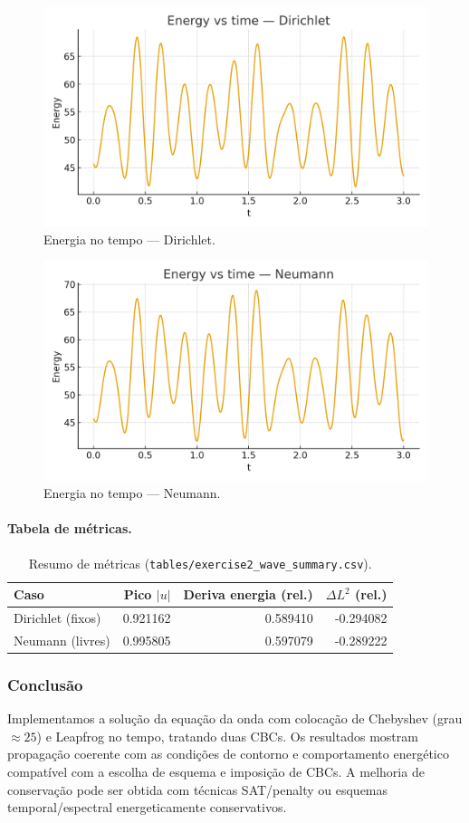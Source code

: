 \documentclass[12pt,a4paper]{article}
\begin{document}
\begin{figure}[H]\centering
\includegraphics[width=.75\linewidth]{figures/energy_dirichlet.png}
\caption{Energia no tempo — Dirichlet.}\label{fig:energy_dirichlet}
\end{figure}

\begin{figure}[H]\centering
\includegraphics[width=.75\linewidth]{figures/energy_neumann.png}
\caption{Energia no tempo — Neumann.}\label{fig:energy_neumann}
\end{figure}

\paragraph{Tabela de métricas.}
\begin{table}[H]\centering
\begin{tabular}{lrrr}\toprule
Caso & Pico $|u|$ & Deriva energia (rel.) & $\Delta L^2$ (rel.)\\\midrule
Dirichlet (fixos) & 0.921162 & 0.589410 & -0.294082\\
Neumann (livres)  & 0.995805 & 0.597079 & -0.289222\\\bottomrule
\end{tabular}
\caption{Resumo de métricas (\texttt{tables/exercise2\_wave\_summary.csv}).}
\end{table}

\subsubsection{Conclusão}
Implementamos a solução da equação da onda com colocação de Chebyshev (grau \(\approx 25\)) e Leapfrog no tempo, tratando duas CBCs.
Os resultados mostram propagação coerente com as condições de contorno e comportamento energético compatível com a escolha de esquema e imposição de CBCs.
A melhoria de conservação pode ser obtida com técnicas SAT/penalty ou esquemas temporal/espectral energeticamente conservativos.
\end{document}
